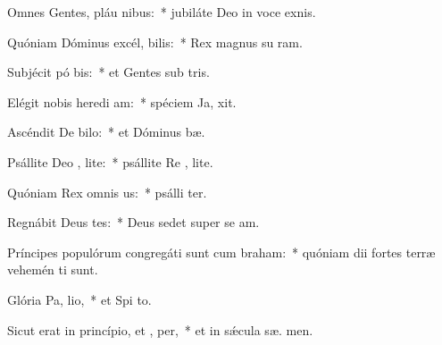 \item Omnes Gentes, pláu nibus:~* jubiláte Deo in voce exnis.
\item Quóniam Dóminus excél, bilis:~* Rex magnus su  ram.
\item Subjécit pó bis:~* et Gentes sub  tris.
\item Elégit nobis heredi am:~* spéciem Ja,  xit.
\item Ascéndit De  bilo:~* et Dóminus   bæ.
\item Psállite Deo , lite:~* psállite Re , lite.
\item Quóniam Rex omnis  us:~* psálli ter.
\item Regnábit Deus  tes:~* Deus sedet super se  am.
\item Príncipes populórum congregáti sunt cum  braham:~* quóniam dii fortes terræ vehemén ti sunt.
\item Glória Pa,  lio,~* et Spi to.
\item Sicut erat in princípio, et ,  per,~* et in sǽcula sæ. men.
